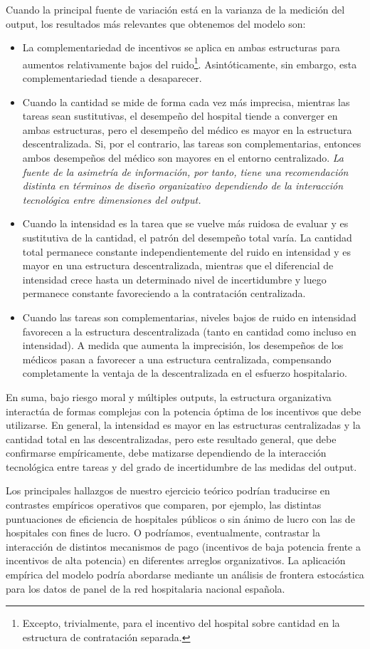 ﻿\documentclass[12pt,letterpaper]{article}
\begin{document}
Cuando la principal fuente de variación está en la varianza de la medición del output, los resultados más relevantes que obtenemos del modelo son:
\begin{itemize}
  \item La complementariedad de incentivos se aplica en ambas estructuras para aumentos relativamente bajos del ruido\footnote{Excepto, trivialmente, para el incentivo del hospital sobre cantidad en la estructura de contratación separada.}. Asintóticamente, sin embargo, esta complementariedad tiende a desaparecer.
  \item Cuando la cantidad se mide de forma cada vez más imprecisa, mientras las tareas sean sustitutivas, el desempeño del hospital tiende a converger en ambas estructuras, pero el desempeño del médico es mayor en la estructura descentralizada. Si, por el contrario, las tareas son complementarias, entonces ambos desempeños del médico son mayores en el entorno centralizado. \emph{La fuente de la asimetría de información, por tanto, tiene una recomendación distinta en términos de diseño organizativo dependiendo de la interacción tecnológica entre dimensiones del output.}
  \item Cuando la intensidad es la tarea que se vuelve más ruidosa de evaluar y es sustitutiva de la cantidad, el patrón del desempeño total varía. La cantidad total permanece constante independientemente del ruido en intensidad y es mayor en una estructura descentralizada, mientras que el diferencial de intensidad crece hasta un determinado nivel de incertidumbre y luego permanece constante favoreciendo a la contratación centralizada.
  \item Cuando las tareas son complementarias, niveles bajos de ruido en intensidad favorecen a la estructura descentralizada (tanto en cantidad como incluso en intensidad). A medida que aumenta la imprecisión, los desempeños de los médicos pasan a favorecer a una estructura centralizada, compensando completamente la ventaja de la descentralizada en el esfuerzo hospitalario.
\end{itemize}

En suma, bajo riesgo moral y múltiples outputs, la estructura organizativa interactúa de formas complejas con la potencia óptima de los incentivos que debe utilizarse. En general, la intensidad es mayor en las estructuras centralizadas y la cantidad total en las descentralizadas, pero este resultado general, que debe confirmarse empíricamente, debe matizarse dependiendo de la interacción tecnológica entre tareas y del grado de incertidumbre de las medidas del output.

Los principales hallazgos de nuestro ejercicio teórico podrían traducirse en contrastes empíricos operativos que comparen, por ejemplo, las distintas puntuaciones de eficiencia de hospitales públicos o sin ánimo de lucro con las de hospitales con fines de lucro. O podríamos, eventualmente, contrastar la interacción de distintos mecanismos de pago (incentivos de baja potencia frente a incentivos de alta potencia) en diferentes arreglos organizativos. La aplicación empírica del modelo podría abordarse mediante un análisis de frontera estocástica para los datos de panel de la red hospitalaria nacional española.

\newpage


\end{document}
